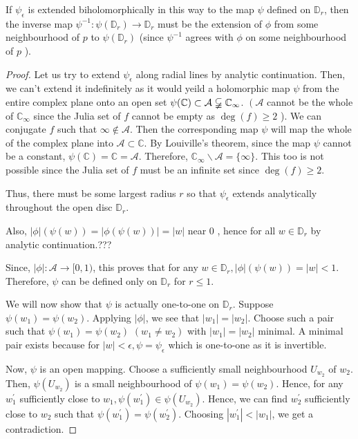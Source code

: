 If $\psi_{\epsilon}$ is extended biholomorphically in this way to the map $\psi$ defined on $\mathbb{D}_{r}$, then the inverse map $\psi^{-1}: \psi\left(\mathbb{D}_{r}\right) \rightarrow \mathbb{D}_{r}$ must be the extension of $\phi$ from some neighbourhood of $p$ to $\psi\left(\mathbb{D}_{r}\right)$ (since $\psi^{-1}$ agrees with $\phi$ on some neighbourhood of $p$ ).

\begin{proof}
Let us try to extend $\psi_{\epsilon}$ along radial lines by analytic continuation. Then, we can't extend it indefinitely as it would yeild a holomorphic map $\psi$ from the entire complex plane onto an open set $\psi(\mathbb{C}) \subset \mathcal{A} \varsubsetneqq \mathbb{C}_{\infty}$. $\left(\mathcal{A}\right.$ cannot be the whole of $\mathbb{C}_{\infty}$ since the Julia set of $f$ cannot be empty as $\operatorname{deg}(f) \geq 2$ ). We can conjugate $f$ such that $\infty \notin \mathcal{A}$. Then the corresponding map $\psi$ will map the whole of the complex plane into $\mathcal{A} \subset \mathbb{C}$. By Louiville's theorem, since the map $\psi$ cannot be a constant, $\psi(\mathbb{C})=\mathbb{C}=\mathcal{A}$. Therefore, $\mathbb{C}_{\infty} \backslash \mathcal{A}=\{\infty\}$. This too is not possible since the Julia set of $f$ must be an infinite set since $\operatorname{deg}(f) \geq 2$.

Thus, there must be some largest radius $r$ so that $\psi_{\epsilon}$ extends analytically throughout the open disc $\mathbb{D}_{r}$.

Also, $|\phi|(\psi(w))=|\phi(\psi(w))|=|w|$ near 0 , hence for all $w \in \mathbb{D}_{r}$ by analytic continuation.???

Since, $|\phi|: \mathcal{A} \rightarrow[0,1)$, this proves that for any $w \in \mathbb{D}_{r},|\phi|(\psi(w))=|w|<1$. Therefore, $\psi$ can be defined only on $\mathbb{D}_{r}$ for $r \leq 1$.

We will now show that $\psi$ is actually one-to-one on $\mathbb{D}_{r}$. Suppose $\psi\left(w_{1}\right)=\psi\left(w_{2}\right)$. Applying $|\phi|$, we see that $\left|w_{1}\right|=\left|w_{2}\right|$. Choose such a pair such that $\psi\left(w_{1}\right)=\psi\left(w_{2}\right)$ $\left(w_{1} \neq w_{2}\right)$ with $\left|w_{1}\right|=\left|w_{2}\right|$ minimal. A minimal pair exists because for $|w|<\epsilon, \psi=\psi_{\epsilon}$ which is one-to-one as it is invertible.

Now, $\psi$ is an open mapping. Choose a sufficiently small neighbourhood $U_{w_{2}}$ of $w_{2}$. Then, $\psi\left(U_{w_{2}}\right)$ is a small neighbourhood of $\psi\left(w_{1}\right)=\psi\left(w_{2}\right)$. Hence, for any $w_{1}^{\prime}$ sufficiently close to $w_{1}, \psi\left(w_{1}^{\prime}\right) \in \psi\left(U_{w_{2}}\right)$. Hence, we can find $w_{2}^{\prime}$ sufficiently close to $w_{2}$ such that $\psi\left(w_{1}^{\prime}\right)=\psi\left(w_{2}^{\prime}\right)$. Choosing $\left|w_{1}^{\prime}\right|<\left|w_{1}\right|$, we get a contradiction.


\end{proof}
